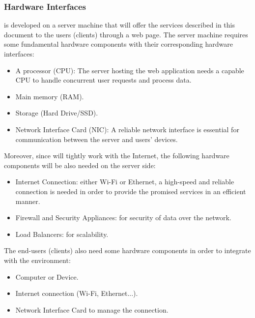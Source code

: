 \subsubsection{Hardware Interfaces}
\app is developed on a server machine that will offer the services described in this document to the users (clients) through a web page.
The server machine requires some fundamental hardware components with their corresponding hardware interfaces:
\begin{itemize}
	\item A processor (CPU): The server hosting the web application needs a capable CPU to handle concurrent user requests and process data.
	\item Main memory (RAM).
	\item Storage (Hard Drive/SSD).
	\item Network Interface Card (NIC): A reliable network interface is essential for communication between the server and users' devices.
\end{itemize}

Moreover, since \app will tightly work with the Internet, the following hardware components will be also needed on the server side:
\begin{itemize}
	\item Internet Connection: either Wi-Fi or Ethernet, a high-speed and reliable connection is needed in order to provide the promised services in an efficient manner.
	\item Firewall and Security Appliances: for security of data over the network.
	\item Load Balancers: for scalability.
\end{itemize}

The end-users (clients) also need some hardware components in order to integrate with the \app environment:
\begin{itemize}
	\item Computer or Device.
	\item Internet connection (Wi-Fi, Ethernet...).
	\item Network Interface Card to manage the connection.
\end{itemize}


